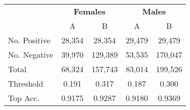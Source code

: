 
\begin{tabular}{l c c c c} %
    \toprule 
    & \multicolumn{2}{c}{\textbf{Females}} & \multicolumn{2}{c}{\textbf{Males}}        \\
    \cmidrule(l){2-3} \cmidrule(l){4-5} %
     & A & B & A & B\\ %
    \midrule
    No. Positive & 28,354 & 28,354 & 29,479 & 29,479\\ %
    No. Negative &39,970 & 129,389 & 53,535& 170,047 \\ %
    Total & 68,324 & 157,743 &  83,014&199,526 \\ %
    \midrule
    Threshold & 0.191 & 0.317 & 0.187 & 0.300 \\ %
    Top Acc. & 0.9175 & 0.9287 & 0.9180 &0.9369 \\ %
\end{tabular}